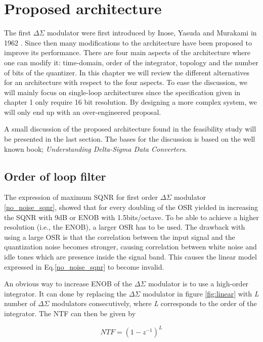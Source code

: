 \chapter{Proposed architecture}\label{architecture}

The first $\Delta\Sigma$ modulator were first introduced by Inose, Yasuda and Murakami in 1962 \cite{first_delta}. Since then many modifications to the architecture have been proposed to improve its performance. There are four main aspects of the architecture where one can modify it: time-domain, order of the integrator, topology and the number of bits of the quantizer. In this chapter we will review the different alternatives for an architecture with respect to the four aspects. To ease the discussion, we will mainly focus on single-loop architectures since the specification given in chapter 1 only require 16 bit resolution. By designing a more complex system, we will only end up with an over-engineered proposal. 

A small discussion of the proposed architecture found in the feasibility study will be presented in the last section. The bases for the discussion is based on the well known book; \textit{Understanding Delta-Sigma Data Converters}\cite{Richard}. 

\section{Order of loop filter}

The expression of maximum SQNR for first order $\Delta\Sigma$ modulator \ref{no_noise_sqnr}, showed that for every doubling of the OSR yielded in increasing the SQNR with 9dB or ENOB with 1.5bits/octave. To be able to achieve a higher resolution (i.e., the ENOB), a larger OSR has to be used. The drawback with using a large OSR is that the correlation between the input signal and the quantization noise becomes stronger, causing correlation between white noise and idle tones which are presence inside the signal band. This causes the linear model expressed in Eq.\ref{no_noise_sqnr} to become invalid.

An obvious way to increase ENOB of the $\Delta\Sigma$ modulator is to use a high-order integrator. It can done by replacing the $\Delta\Sigma$ modulator in figure \ref{fig:linear} with \textit{L} number of $\Delta\Sigma$ modulators consecutively, where \textit{L} corresponds to the order of the integrator. The NTF can then be given by

\begin{equation}
    NTF = (1-z^{-1})^L
\end{equation}

